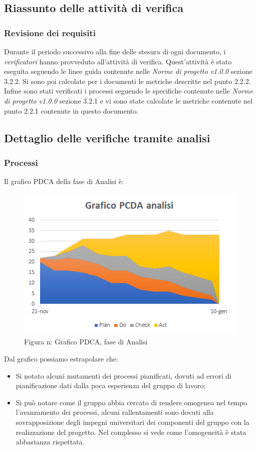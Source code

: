 \subsection{Riassunto delle attività di verifica}
\subsubsection{Revisione dei requisiti}
Durante il periodo successivo alla fine delle stesura di ogni documento, i \emph{verificatori}  hanno provveduto all'attività di verifica. Quest'attività è stato eseguita seguendo le linee guida contenute nelle \emph{Norme di progetto v1.0.0} sezione 3.2.2.
Si sono poi calcolate per i documenti le metriche descritte nel punto 2.2.2.
Infine sono stati verificati i processi seguendo le specifiche contenute nelle \emph{Norme di progetto v1.0.0} sezione 3.2.1 e vi sono state calcolate le metriche contenute nel punto 2.2.1 contenute in questo documento.
\subsection{Dettaglio delle verifiche tramite analisi}
\subsubsection{Processi}
Il grafico PDCA della fase di Analisi è:
\begin{figure} [H]
	\centering
	\includegraphics[scale=1]{Img/Grafico_PCDA}
	\caption{Figura n: Grafico PDCA, fase di Analisi}\label{}
\end{figure}
Dal grafico possiamo estrapolare che:
\begin{itemize}
	\item Si notato alcuni mutamenti dei processi pianificati, dovuti ad errori di pianificazione dati dalla poca esperienza del gruppo di lavoro;
	\item Si può notare come il gruppo abbia cercato di rendere omogenea nel tempo l'avanzamento dei processi, alcuni rallentamenti sono dovuti alla sovrapposizione degli impegni
	universitari dei componenti del gruppo con la realizzazione del progetto. Nel complesso si vede come l'omogeneità è stata abbastanza rispettata.
\end{itemize}
